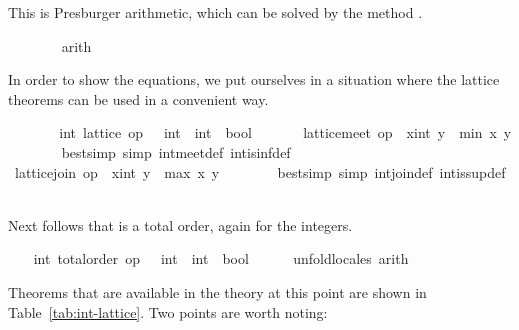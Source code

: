 \begin{isabellebody}
\begin{isamarkuptxt}
\begin{isabelle}
\end{isabelle}
	This is Presburger arithmetic, which can be solved by the
	method .%
\end{isamarkuptxt}%
\isamarkuptrue%
\ \ \ \ \ \ \isamarkupfalse%
\ arith{\isacharplus}%
\begin{isamarkuptxt}%
\normalsize In order to show the equations, we put ourselves
      in a situation where the lattice theorems can be used in a
      convenient way.%
\end{isamarkuptxt}%
\isamarkuptrue%
\ \ \ \ \isamarkupfalse%
\ \isamarkupfalse%
\ int{\isacharcolon}\ lattice\ {\isachardoublequoteopen}op\ {\isasymle}\ {\isacharcolon}{\isacharcolon}\ int\ {\isasymRightarrow}\ int\ {\isasymRightarrow}\ bool{\isachardoublequoteclose}\ \isacommand{{\isachardot}}\isamarkupfalse%
\isanewline
\ \ \ \ \isamarkupfalse%
\ {\isachardoublequoteopen}lattice{\isachardot}meet\ op\ {\isasymle}\ {\isacharparenleft}x{\isacharcolon}{\isacharcolon}int{\isacharparenright}\ y\ {\isacharequal}\ min\ x\ y{\isachardoublequoteclose}\isanewline
\ \ \ \ \ \ \isamarkupfalse%
\ {\isacharparenleft}bestsimp\ simp{\isacharcolon}\ int{\isachardot}meet{\isacharunderscore}def\ int{\isachardot}is{\isacharunderscore}inf{\isacharunderscore}def{\isacharparenright}\isanewline
\ \ \ \ \isamarkupfalse%
\ {\isachardoublequoteopen}lattice{\isachardot}join\ op\ {\isasymle}\ {\isacharparenleft}x{\isacharcolon}{\isacharcolon}int{\isacharparenright}\ y\ {\isacharequal}\ max\ x\ y{\isachardoublequoteclose}\isanewline
\ \ \ \ \ \ \isamarkupfalse%
\ {\isacharparenleft}bestsimp\ simp{\isacharcolon}\ int{\isachardot}join{\isacharunderscore}def\ int{\isachardot}is{\isacharunderscore}sup{\isacharunderscore}def{\isacharparenright}\isanewline
\ \ \isamarkupfalse%
%
\endisatagvisible
{\isafoldvisible}%
%
\isadelimvisible
%
\endisadelimvisible
%
\begin{isamarkuptext}%
Next follows that  is a total order, again for
  the integers.%
\end{isamarkuptext}%
\isamarkuptrue%
%
\isadelimvisible
\ \ %
\endisadelimvisible
%
\isatagvisible
{}\isamarkupfalse%
\ int{\isacharcolon}\ total{\isacharunderscore}order\ {\isachardoublequoteopen}op\ {\isasymle}\ {\isacharcolon}{\isacharcolon}\ int\ {\isasymRightarrow}\ int\ {\isasymRightarrow}\ bool{\isachardoublequoteclose}\isanewline
\ \ \ \ \isamarkupfalse%
\ unfold{\isacharunderscore}locales\ arith%
\endisatagvisible
{\isafoldvisible}%
%
\isadelimvisible
%
\endisadelimvisible
%
\begin{isamarkuptext}%
Theorems that are available in the theory at this point are shown in
  Table~\ref{tab:int-lattice}.  Two points are worth noting:


\end{isamarkuptext}
\end{isabellebody}
